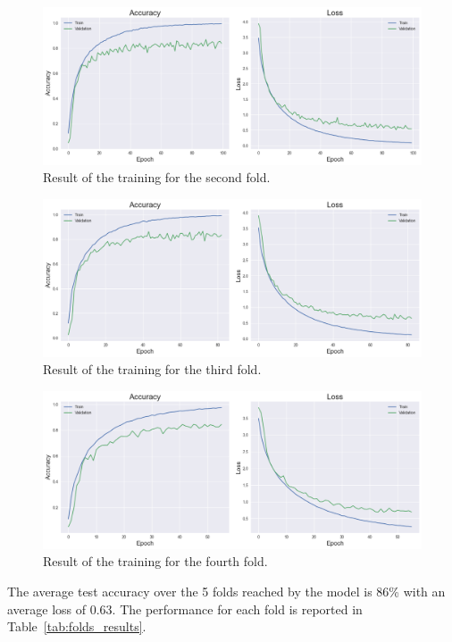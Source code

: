 \documentclass{article}
\begin{document}
\begin{sloppy}
\begin{figure}[ht]
  \centering
  \centerline{\includegraphics[width=\columnwidth]{fold2.png}}
  \caption{Result of the training for the second fold.}
  \label{fig:fold2}
\end{figure}

\begin{figure}[ht]
  \centering
  \centerline{\includegraphics[width=\columnwidth]{fold3.png}}
  \caption{Result of the training for the third fold.}
  \label{fig:fold3}
\end{figure}

\begin{figure}[ht]
  \centering
  \centerline{\includegraphics[width=\columnwidth]{fold4.png}}
  \caption{Result of the training for the fourth fold.}
  \label{fig:fold4}
\end{figure}

The average test accuracy over the 5 folds reached by the model is 86\% with an average loss of 0.63.
The performance for each fold is reported in Table~\ref{tab:folds_results}.


\end{sloppy}
\end{document}
